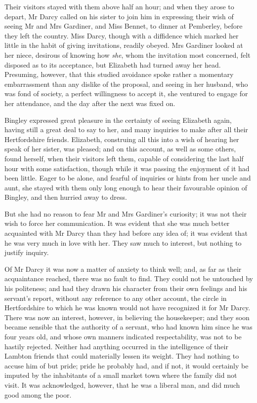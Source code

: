 Their visitors stayed with them above half an hour; and when they arose to depart, Mr Darcy called on his sister to join him in expressing their wish of seeing Mr and Mrs Gardiner, and Miss Bennet, to dinner at Pemberley, before they left the country. Miss Darcy, though with a diffidence which marked her little in the habit of giving invitations, readily obeyed. Mrs Gardiner looked at her niece, desirous of knowing how \textit{she}, whom the invitation most concerned, felt disposed as to its acceptance, but Elizabeth had turned away her head. Presuming, however, that this studied avoidance spoke rather a momentary embarrassment than any dislike of the proposal, and seeing in her husband, who was fond of society, a perfect willingness to accept it, she ventured to engage for her attendance, and the day after the next was fixed on.

Bingley expressed great pleasure in the certainty of seeing Elizabeth again, having still a great deal to say to her, and many inquiries to make after all their Hertfordshire friends. Elizabeth, construing all this into a wish of hearing her speak of her sister, was pleased; and on this account, as well as some others, found herself, when their visitors left them, capable of considering the last half hour with some satisfaction, though while it was passing the enjoyment of it had been little. Eager to be alone, and fearful of inquiries or hints from her uncle and aunt, she stayed with them only long enough to hear their favourable opinion of Bingley, and then hurried away to dress.

But she had no reason to fear Mr and Mrs Gardiner's curiosity; it was not their wish to force her communication. It was evident that she was much better acquainted with Mr Darcy than they had before any idea of; it was evident that he was very much in love with her. They saw much to interest, but nothing to justify inquiry.

Of Mr Darcy it was now a matter of anxiety to think well; and, as far as their acquaintance reached, there was no fault to find. They could not be untouched by his politeness; and had they drawn his character from their own feelings and his servant's report, without any reference to any other account, the circle in Hertfordshire to which he was known would not have recognized it for Mr Darcy. There was now an interest, however, in believing the housekeeper; and they soon became sensible that the authority of a servant, who had known him since he was four years old, and whose own manners indicated respectability, was not to be hastily rejected. Neither had anything occurred in the intelligence of their Lambton friends that could materially lessen its weight. They had nothing to accuse him of but pride; pride he probably had, and if not, it would certainly be imputed by the inhabitants of a small market town where the family did not visit. It was acknowledged, however, that he was a liberal man, and did much good among the poor.

